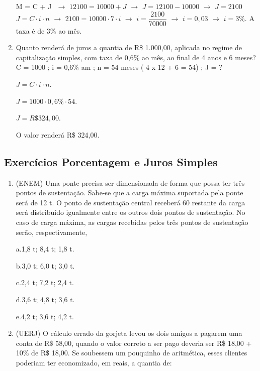 \begin{multicols*}{2}
\begin{enumerate}
              M = C + J $\, \, \rightarrow \, \, 12100 = 10000 + J \, \, \rightarrow \, \, J = 12100 - 10000 \, \, \rightarrow \, \, J = 2100$\\

              $ J = C \cdot i \cdot n \, \, \rightarrow \, \,2100 = 10000 \cdot 7 \cdot i \, \, \rightarrow \, \, i = \dfrac{2100}{70000} \, \, \rightarrow \, \, i = 0,03 \, \, \rightarrow \, \, i = 3\% $. A taxa é de 3\% ao mês.

        \item Quanto renderá de juros a quantia de R\$ 1.000,00, aplicada no regime de capitalização simples, com taxa de 0,6\% ao mês, ao final de 4 anos e 6 meses? C = 1000 ; i = 0,6\% am ; n = 54 meses ( 4 x 12 + 6 = 54) ; J = ?

              $ J = C \cdot i \cdot n$.

              $ J = 1000 \cdot 0,6\% \cdot 54 $.

              $ J = R\$ 324,00 $.

              O valor renderá R\$ 324,00.

    \end{enumerate}

    \subsection{Exercícios Porcentagem e Juros Simples}

    \begin{enumerate}

        \item (ENEM) Uma ponte precisa ser dimensionada de forma que possa ter três pontos de sustentação. Sabe-se que a carga máxima suportada pela ponte será de 12 t. O ponto de sustentação central receberá 60%
              restante da carga será distribuído igualmente entre os outros dois pontos de sustentação. No caso de carga máxima, as cargas recebidas pelos três pontos de sustentação serão, respectivamente,

              a.1,8 t; 8,4 t; 1,8 t.

              b.3,0 t; 6,0 t; 3,0 t.

              c.2,4 t; 7,2 t; 2,4 t.

              d.3,6 t; 4,8 t; 3,6 t.

              e.4,2 t; 3,6 t; 4,2 t.

        \item (UERJ) O cálculo errado da gorjeta levou os dois amigos a pagarem uma conta de R\$ 58,00, quando o valor correto a ser pago deveria ser R\$ 18,00 + 10\% de R\$ 18,00. Se soubessem um pouquinho de aritmética, esses clientes
              poderiam ter economizado, em reais, a quantia de:


\end{enumerate}
\end{multicols*}
